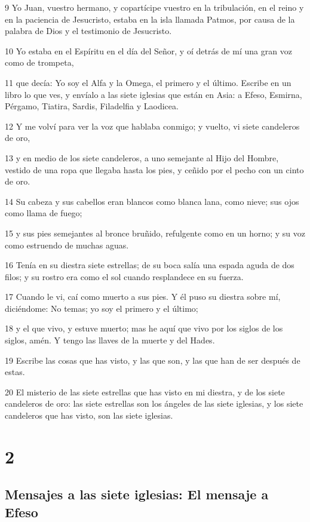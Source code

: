\par 9 Yo Juan, vuestro hermano, y copartícipe vuestro en la tribulación, en el reino y en la paciencia de Jesucristo, estaba en la isla llamada Patmos, por causa de la palabra de Dios y el testimonio de Jesucristo.
\par 10 Yo estaba en el Espíritu en el día del Señor, y oí detrás de mí una gran voz como de trompeta,
\par 11 que decía: Yo soy el Alfa y la Omega, el primero y el último. Escribe en un libro lo que ves, y envíalo a las siete iglesias que están en Asia: a Efeso, Esmirna, Pérgamo, Tiatira, Sardis, Filadelfia y Laodicea.
\par 12 Y me volví para ver la voz que hablaba conmigo; y vuelto, vi siete candeleros de oro,
\par 13 y en medio de los siete candeleros, a uno semejante al Hijo del Hombre, vestido de una ropa que llegaba hasta los pies, y ceñido por el pecho con un cinto de oro.
\par 14 Su cabeza y sus cabellos eran blancos como blanca lana, como nieve; sus ojos como llama de fuego;
\par 15 y sus pies semejantes al bronce bruñido, refulgente como en un horno; y su voz como estruendo de muchas aguas.
\par 16 Tenía en su diestra siete estrellas; de su boca salía una espada aguda de dos filos; y su rostro era como el sol cuando resplandece en su fuerza.
\par 17 Cuando le vi, caí como muerto a sus pies. Y él puso su diestra sobre mí, diciéndome: No temas; yo soy el primero y el último;
\par 18 y el que vivo, y estuve muerto; mas he aquí que vivo por los siglos de los siglos, amén. Y tengo las llaves de la muerte y del Hades.
\par 19 Escribe las cosas que has visto, y las que son, y las que han de ser después de estas.
\par 20 El misterio de las siete estrellas que has visto en mi diestra, y de los siete candeleros de oro: las siete estrellas son los ángeles de las siete iglesias, y los siete candeleros que has visto, son las siete iglesias.

\chapter{2}

\section*{Mensajes a las siete iglesias: El mensaje a Efeso}

